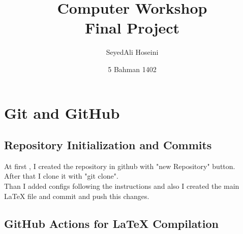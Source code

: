 \documentclass[titlepage]{article}
\title{Computer Workshop\\Final Project}
\author{SeyedAli Hoseini}
\date{5 Bahman 1402}
\begin{document}
\pagestyle{fancy}
\maketitle
\tableofcontents
\newpage
\section{ Git and GitHub}
\subsection{Repository Initialization and Commits}
At first , I created the repository in github with "new Repository" button.
\\After that I clone it with "git clone".
\\Than I added configs following the instructions and also I created the main LaTeX file and commit and push this changes.
\subsection{GitHub Actions for LaTeX Compilation}
\newpage
\end{document}

